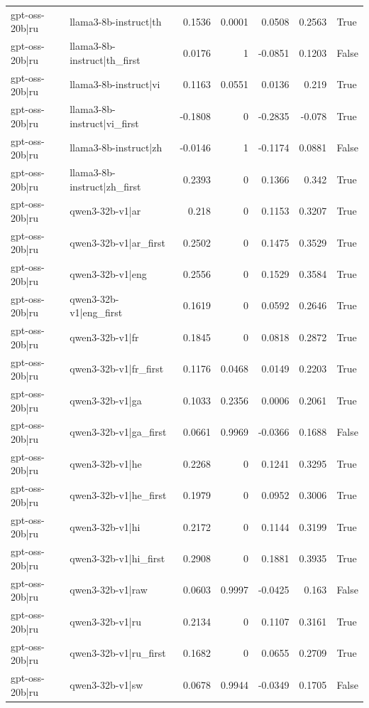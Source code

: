 \begin{table}
\begin{tabular}{l l r r r r l}
gpt-oss-20b|ru & llama3-8b-instruct|th & 0.1536 & 0.0001 & 0.0508 & 0.2563 & True \\
gpt-oss-20b|ru & llama3-8b-instruct|th_first & 0.0176 & 1 & -0.0851 & 0.1203 & False \\
gpt-oss-20b|ru & llama3-8b-instruct|vi & 0.1163 & 0.0551 & 0.0136 & 0.219 & True \\
gpt-oss-20b|ru & llama3-8b-instruct|vi_first & -0.1808 & 0 & -0.2835 & -0.078 & True \\
gpt-oss-20b|ru & llama3-8b-instruct|zh & -0.0146 & 1 & -0.1174 & 0.0881 & False \\
gpt-oss-20b|ru & llama3-8b-instruct|zh_first & 0.2393 & 0 & 0.1366 & 0.342 & True \\
gpt-oss-20b|ru & qwen3-32b-v1|ar & 0.218 & 0 & 0.1153 & 0.3207 & True \\
gpt-oss-20b|ru & qwen3-32b-v1|ar_first & 0.2502 & 0 & 0.1475 & 0.3529 & True \\
gpt-oss-20b|ru & qwen3-32b-v1|eng & 0.2556 & 0 & 0.1529 & 0.3584 & True \\
gpt-oss-20b|ru & qwen3-32b-v1|eng_first & 0.1619 & 0 & 0.0592 & 0.2646 & True \\
gpt-oss-20b|ru & qwen3-32b-v1|fr & 0.1845 & 0 & 0.0818 & 0.2872 & True \\
gpt-oss-20b|ru & qwen3-32b-v1|fr_first & 0.1176 & 0.0468 & 0.0149 & 0.2203 & True \\
gpt-oss-20b|ru & qwen3-32b-v1|ga & 0.1033 & 0.2356 & 0.0006 & 0.2061 & True \\
gpt-oss-20b|ru & qwen3-32b-v1|ga_first & 0.0661 & 0.9969 & -0.0366 & 0.1688 & False \\
gpt-oss-20b|ru & qwen3-32b-v1|he & 0.2268 & 0 & 0.1241 & 0.3295 & True \\
gpt-oss-20b|ru & qwen3-32b-v1|he_first & 0.1979 & 0 & 0.0952 & 0.3006 & True \\
gpt-oss-20b|ru & qwen3-32b-v1|hi & 0.2172 & 0 & 0.1144 & 0.3199 & True \\
gpt-oss-20b|ru & qwen3-32b-v1|hi_first & 0.2908 & 0 & 0.1881 & 0.3935 & True \\
gpt-oss-20b|ru & qwen3-32b-v1|raw & 0.0603 & 0.9997 & -0.0425 & 0.163 & False \\
gpt-oss-20b|ru & qwen3-32b-v1|ru & 0.2134 & 0 & 0.1107 & 0.3161 & True \\
gpt-oss-20b|ru & qwen3-32b-v1|ru_first & 0.1682 & 0 & 0.0655 & 0.2709 & True \\
gpt-oss-20b|ru & qwen3-32b-v1|sw & 0.0678 & 0.9944 & -0.0349 & 0.1705 & False \\

\end{tabular}
\end{table}
